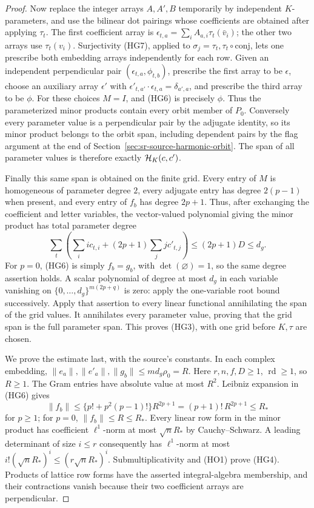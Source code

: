 \begin{proof}
Now replace the integer arrays \(A,A',B\) temporarily
by independent \(K\)-parameters, and use the bilinear dot pairings whose coefficients
are obtained after applying \(\tau_t\).
The first coefficient array is
\(\epsilon_{t,a}=\sum_i A_{a,i}\tau_t(\bar v_i)\);
the other two arrays use \(\tau_t(v_i)\).
Surjectivity (HG7), applied to
\(\sigma_j=\tau_t,\tau_t\circ\mathrm{conj}\), lets
one prescribe both embedding arrays independently
for each row.
Given an independent perpendicular pair
\((\epsilon_{t,a},\phi_{t,b})\), prescribe the first
array to be \(\epsilon\), choose an auxiliary array
\(\epsilon'\) with
\(\epsilon'_{t,a'}\cdot\epsilon_{t,a}=\delta_{a',a}\),
and prescribe the third array to be \(\phi\).
For these choices \(M=I\), and (HG6) is precisely
\(\phi\).  Thus the parameterized minor products
contain every orbit member of \(P_0\).
Conversely every parameter value is a perpendicular
pair by the adjugate identity, so its minor product
belongs to the orbit span, including dependent pairs
by the flag argument at the end of
Section~\ref{sec:sr-source-harmonic-orbit}.
The span of all parameter values is therefore exactly
\({\cal H}_K(c,c')\).

Finally this same span is obtained on the finite grid.
Every entry of \(M\) is homogeneous of parameter
degree \(2\), every adjugate entry has degree
\(2(p-1)\) when present, and every entry of \(f_b\)
has degree \(2p+1\).
Thus, after exchanging the coefficient and letter
variables, the vector-valued polynomial giving the
minor product has total parameter degree
\[
 \sum_t\left(\sum_i i c_{t,i}
                 +(2p+1)\sum_j j c'_{t,j}\right)
       \le(2p+1)D\le d_g.
\]
For \(p=0\), (HG6) is simply \(f_b=g_b\), with
\(\det(\varnothing)=1\), so the same degree assertion
holds.
A scalar polynomial of degree at most \(d_g\) in
each variable vanishing on
\(\{0,\ldots,d_g\}^{m(2p+q)}\) is zero: apply the
one-variable root bound successively.
Apply that assertion to every linear functional
annihilating the span of the grid values.
It annihilates every parameter value, proving that
the grid span is the full parameter span.
This proves (HG3), with one grid before \(K,\tau\)
are chosen.

We prove the estimate last, with the source's constants.
In each complex embedding,
\(\|e_a\|,\|e'_a\|,\|g_b\|\le m d_g\rho_0=R\).
Here \(r,n,f,D\ge1\), \(\operatorname{rd}\ge1\), so
\(R\ge1\).
The Gram entries have absolute value at most \(R^2\).
Leibniz expansion in (HG6) gives
\[
 \|f_b\|
 \le \{p!+p^2(p-1)!\}R^{2p+1}
       =(p+1)!\,R^{2p+1}\le R_*
\]
for \(p\ge1\); for \(p=0\), \(\|f_b\|\le R\le R_*\).
Every linear row form in the minor product has
coefficient \(\ell^1\)-norm at most \(\sqrt n R_*\)
by Cauchy--Schwarz.
A leading determinant of size \(i\le r\) consequently
has \(\ell^1\)-norm at most
\(i!(\sqrt n R_*)^i\le(r\sqrt n R_*)^i\).
Submultiplicativity and (HO1) prove (HG4).
Products of lattice row forms have the asserted
integral-algebra membership, and their contractions
vanish because their two coefficient arrays are
perpendicular.
\end{proof}

